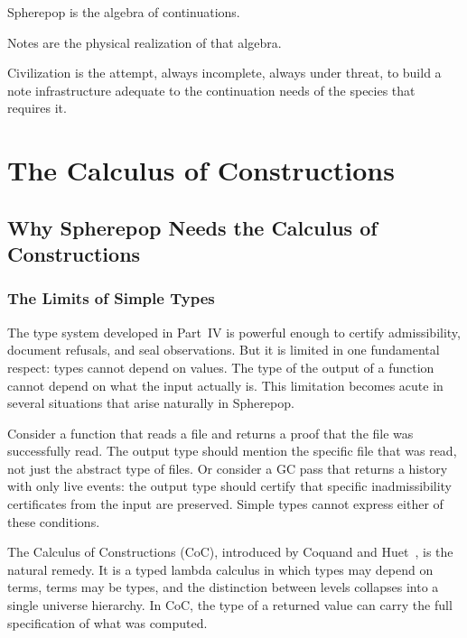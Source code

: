 \documentclass[12pt, a4paper, openany]{book}
\theoremstyle{plain}
\theoremstyle{definition}
\theoremstyle{remark}
\begin{document}
\medskip

Spherepop is the algebra of continuations.

Notes are the physical realization of that algebra.

Civilization is the attempt, always incomplete, always under threat, to build a
note infrastructure adequate to the continuation needs of the species that requires
it.

\newpage


\part{The Calculus of Constructions}

\chapter{Why Spherepop Needs the Calculus of Constructions}

\section{The Limits of Simple Types}

The type system developed in Part~IV is powerful enough to certify admissibility,
document refusals, and seal observations. But it is limited in one fundamental
respect: types cannot depend on values. The type of the output of a function cannot
depend on what the input actually is. This limitation becomes acute in several
situations that arise naturally in Spherepop.

Consider a function that reads a file and returns a proof that the file was
successfully read. The output type should mention the specific file that was read,
not just the abstract type of files. Or consider a GC pass that returns a history
with only live events: the output type should certify that specific inadmissibility
certificates from the input are preserved. Simple types cannot express either of
these conditions.

The Calculus of Constructions (CoC), introduced by Coquand and Huet~\cite{coquand88},
is the natural remedy. It is a typed lambda calculus in which types may depend on
terms, terms may be types, and the distinction between levels collapses into a
single universe hierarchy. In CoC, the type of a returned value can carry the full
specification of what was computed.
\end{document}
